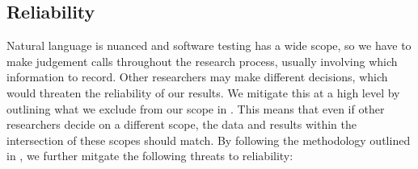 \clearpage
\subsection{Reliability}\label{rel-valid}
Natural language is nuanced and software testing has a wide scope, so we have
to make judgement calls throughout the research process, usually involving
which information to record. Other researchers may make different decisions,
which would threaten the reliability of our results. We mitigate this at a high
level by outlining what we exclude from our scope in . This
means that even if other researchers decide on a different scope, the data and
results within the intersection of these scopes should match. By following the
methodology outlined in , we further mitgate the following
threats to reliability:

